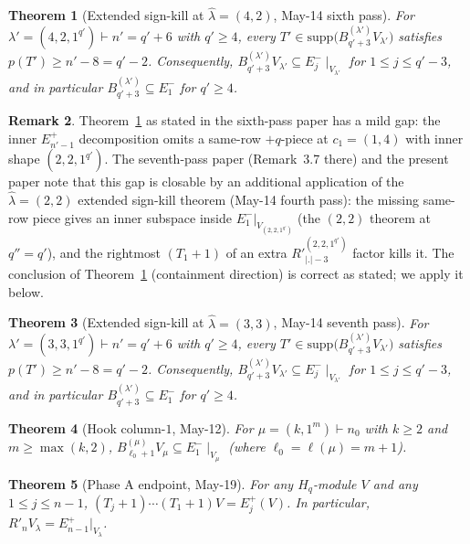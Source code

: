 \documentclass[11pt]{article}
\newtheorem{theorem}{Theorem}
\theoremstyle{definition}
\newtheorem{remark}[theorem]{Remark}
\newcommand{\Hq}{H_q}
\newcommand{\hatl}{\widehat\lambda}
\newcommand{\supp}{\mathrm{supp}}
\newcommand{\Rp}{{R'}}
\begin{document}
\begin{theorem}[Extended sign-kill at $\hatl = (4, 2)$, May-14 sixth pass]\label{thm:42-prefix}
For $\lambda' = (4, 2, 1^{q'}) \vdash n' = q' + 6$ with $q' \ge 4$,
every $T' \in \supp\bigl(B^{(\lambda')}_{q'+3} V_{\lambda'}\bigr)$
satisfies $p(T') \ge n' - 8 = q' - 2$.  Consequently,
$B^{(\lambda')}_{q'+3} V_{\lambda'} \subseteq E_j^-\!\mid_{V_{\lambda'}}$
for $1 \le j \le q' - 3$, and in particular $B^{(\lambda')}_{q'+3} \subseteq E_1^-$
for $q' \ge 4$.
\end{theorem}

\begin{remark}\label{rem:42-gap}
Theorem~\ref{thm:42-prefix} as stated in the sixth-pass paper has a
mild gap: the inner $E_{n'-1}^+$ decomposition omits a same-row $+q$-piece
at $c_1 = (1, 4)$ with inner shape $(2, 2, 1^{q'})$.  The seventh-pass
paper (Remark~3.7 there) and the present paper note that this gap is
closable by an additional application of the $\hatl = (2, 2)$ extended
sign-kill theorem (May-14 fourth pass): the missing same-row piece
gives an inner subspace inside $E_1^-|_{V_{(2,2,1^{q'})}}$ (the $(2,2)$
theorem at $q'' = q'$), and the rightmost $(T_1{+}1)$ of an extra
$\Rp^{(2,2,1^{q'})}_{|.|-3}$ factor kills it.  The conclusion of
Theorem~\ref{thm:42-prefix} (containment direction) is correct as
stated; we apply it below.
\end{remark}

\begin{theorem}[Extended sign-kill at $\hatl = (3, 3)$, May-14 seventh pass]\label{thm:33-prefix}
For $\lambda' = (3, 3, 1^{q'}) \vdash n' = q' + 6$ with $q' \ge 4$,
every $T' \in \supp\bigl(B^{(\lambda')}_{q'+3} V_{\lambda'}\bigr)$
satisfies $p(T') \ge n' - 8 = q' - 2$.  Consequently,
$B^{(\lambda')}_{q'+3} V_{\lambda'} \subseteq E_j^-\!\mid_{V_{\lambda'}}$
for $1 \le j \le q' - 3$, and in particular $B^{(\lambda')}_{q'+3} \subseteq E_1^-$
for $q' \ge 4$.
\end{theorem}

\begin{theorem}[Hook column-$1$, May-12]\label{thm:hook-E1minus}
For $\mu = (k, 1^m) \vdash n_0$ with $k \ge 2$ and $m \ge \max(k, 2)$,
$B^{(\mu)}_{\ell_0+1} V_\mu \subseteq E_1^-\!\mid_{V_\mu}$ (where
$\ell_0 = \ell(\mu) = m + 1$).
\end{theorem}

\begin{theorem}[Phase A endpoint, May-19]\label{thm:phaseA}
For any $\Hq$-module $V$ and any $1 \le j \le n-1$,
$(T_j+1)\cdots(T_1+1) V = E_j^+(V)$.  In particular,
$\Rp_n V_\lambda = E_{n-1}^+|_{V_\lambda}$.
\end{theorem}
\end{document}

